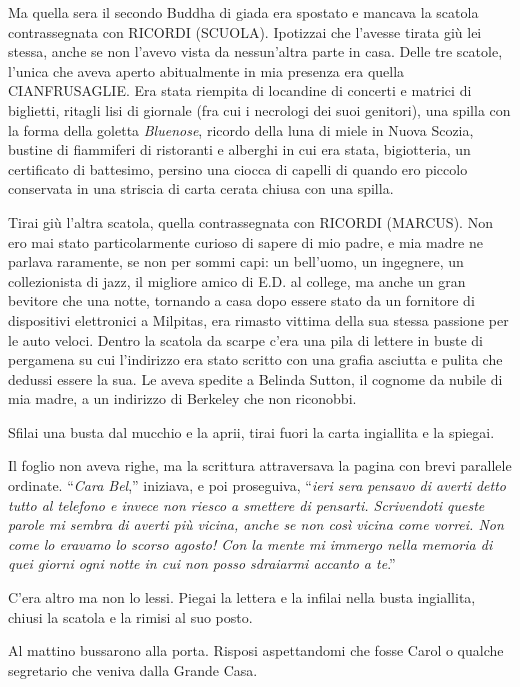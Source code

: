 Ma quella sera il secondo Buddha di giada era spostato e mancava la
scatola contrassegnata con {RICORDI} ({SCUOLA}). Ipotizzai che l'avesse
tirata giù lei stessa, anche se non l'avevo vista da nessun'altra parte
in casa. Delle tre scatole, l'unica che aveva aperto abitualmente in mia
presenza era quella {CIANFRUSAGLIE}. Era stata riempita di locandine di
concerti e matrici di biglietti, ritagli lisi di giornale (fra cui i
necrologi dei suoi genitori), una spilla con la forma della goletta
\emph{Bluenose}, ricordo della luna di miele in Nuova Scozia, bustine di
fiammiferi di ristoranti e alberghi in cui era stata, bigiotteria, un
certificato di battesimo, persino una ciocca di capelli di quando ero
piccolo conservata in una striscia di carta cerata chiusa con una
spilla.

Tirai giù l'altra scatola, quella contrassegnata con {RICORDI}
({MARCUS}). Non ero mai stato particolarmente curioso di sapere di mio
padre, e mia madre ne parlava raramente, se non per sommi capi: un
bell'uomo, un ingegnere, un collezionista di jazz, il migliore amico di
E.D. al college, ma anche un gran bevitore che una notte, tornando a
casa dopo essere stato da un fornitore di dispositivi elettronici a
Milpitas, era rimasto vittima della sua stessa passione per le auto
veloci. Dentro la scatola da scarpe c'era una pila di lettere in buste
di pergamena su cui l'indirizzo era stato scritto con una grafia
asciutta e pulita che dedussi essere la sua. Le aveva spedite a Belinda
Sutton, il cognome da nubile di mia madre, a un indirizzo di Berkeley
che non riconobbi.

Sfilai una busta dal mucchio e la aprii, tirai fuori la carta ingiallita
e la spiegai.

Il foglio non aveva righe, ma la scrittura attraversava la pagina con
brevi parallele ordinate. ``\emph{Cara Bel},'' iniziava, e poi
proseguiva, ``\emph{ieri sera pensavo di averti detto tutto al telefono
	e invece non riesco a smettere di pensarti. Scrivendoti queste parole mi
	sembra di averti più vicina, anche se non così vicina come vorrei. Non
	come lo eravamo lo scorso agosto! Con la mente mi immergo nella memoria
	di quei giorni ogni notte in cui non posso sdraiarmi accanto a te}.''

C'era altro ma non lo lessi. Piegai la lettera e la infilai nella busta
ingiallita, chiusi la scatola e la rimisi al suo posto.

\separatorefiori

Al mattino bussarono alla porta. Risposi aspettandomi che fosse Carol o
qualche segretario che veniva dalla Grande Casa.

